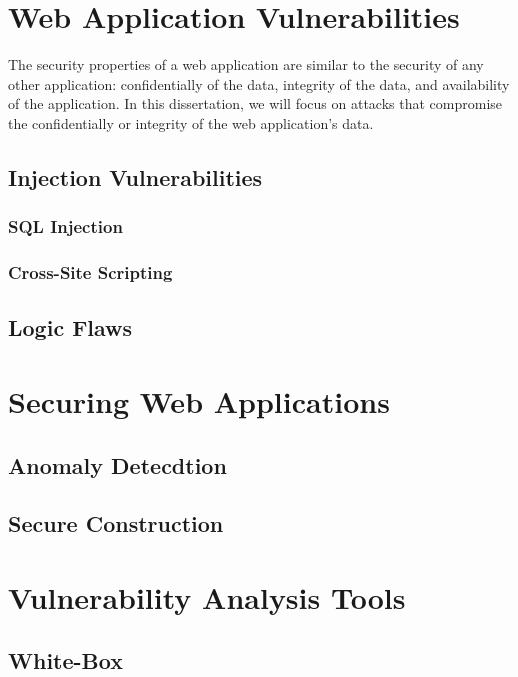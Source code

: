 \section{Web Application Vulnerabilities}

The security properties of a web application are similar to the
security of any other application: confidentially of the data,
integrity of the data, and availability of the application. In this
dissertation, we will focus on attacks that compromise the
confidentially or integrity of the web application's data.

\subsection{Injection Vulnerabilities}

\subsubsection{SQL Injection}

\subsubsection{Cross-Site Scripting}

\subsection{Logic Flaws}

\section{Securing Web Applications}

\subsection{Anomaly Detecdtion}

\subsection{Secure Construction}

\section{Vulnerability Analysis Tools}

\subsection{White-Box}


